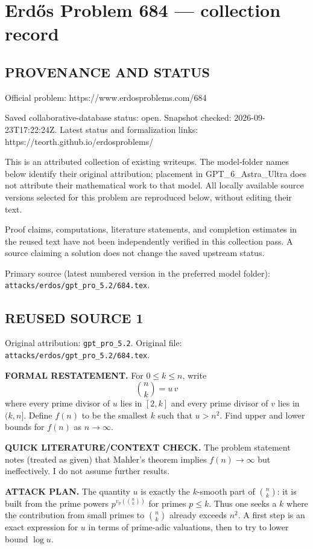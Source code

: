 \section*{Erd\H{o}s Problem 684 --- collection record}

\subsection*{PROVENANCE AND STATUS}
Official problem: https://www.erdosproblems.com/684

Saved collaborative-database status: open.
Snapshot checked: 2026-09-23T17:22:24Z.
Latest status and formalization links: https://teorth.github.io/erdosproblems/

This is an attributed collection of existing writeups. The model-folder names below identify their original attribution; placement in GPT\_6\_Astra\_Ultra does not attribute their mathematical work to that model. All locally available source versions selected for this problem are reproduced below, without editing their text.

Proof claims, computations, literature statements, and completion estimates in the reused text have not been independently verified in this collection pass. A source claiming a solution does not change the saved upstream status.

Primary source (latest numbered version in the preferred model folder): \texttt{attacks/erdos/gpt\_pro\_5.2/684.tex}.

\subsection*{REUSED SOURCE 1}
Original attribution: \texttt{gpt\_pro\_5.2}.
Original file: \texttt{attacks/erdos/gpt\_pro\_5.2/684.tex}.

\item
\textbf{FORMAL RESTATEMENT.}
For $0\le k\le n$, write
\[\binom{n}{k}=u\,v\]
where every prime divisor of $u$ lies in $[2,k]$ and every prime divisor of $v$ lies in $(k,n]$.
Define $f(n)$ to be the smallest $k$ such that $u>n^{2}$.
Find upper and lower bounds for $f(n)$ as $n\to\infty$.

\textbf{QUICK LITERATURE/CONTEXT CHECK.}
The problem statement notes (treated as given) that Mahler's theorem implies $f(n)\to\infty$ but ineffectively. I do not assume further results.

\textbf{ATTACK PLAN.}
The quantity $u$ is exactly the $k$-smooth part of $\binom{n}{k}$: it is built from the prime powers $p^{v_p(\binom{n}{k})}$ for primes $p\le k$. Thus one seeks a $k$ where the contribution from small primes to $\binom{n}{k}$ already exceeds $n^2$.
A first step is an exact expression for $u$ in terms of prime-adic valuations, then to try to lower bound $\log u$.

